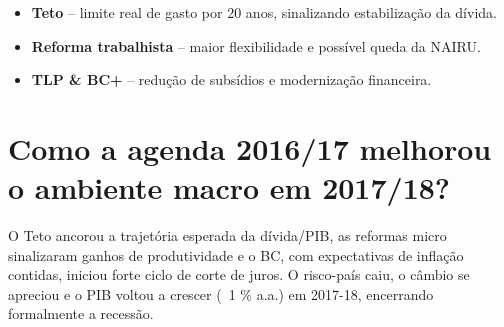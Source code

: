 \documentclass{sciposter}
\begin{document}
\begin{multicols}{3}
\begin{itemize}
  \item \textbf{Teto} – limite real de gasto por 20 anos, sinalizando estabilização da dívida. 
  \item \textbf{Reforma trabalhista} – maior flexibilidade e possível queda da NAIRU. 
  \item \textbf{TLP \& BC+} – redução de subsídios e modernização financeira. 
\end{itemize}

\section{\textbf{Como a agenda 2016/17 melhorou o ambiente macro em 2017/18?}}

O Teto ancorou a trajetória esperada da dívida/PIB, as reformas micro sinalizaram ganhos de produtividade e o BC, com expectativas de inflação contidas, iniciou forte ciclo de corte de juros. O risco-país caiu, o câmbio se apreciou e o PIB voltou a crescer (~1 \% a.a.) em 2017-18, encerrando formalmente a recessão. 

\end{multicols}
\end{document}
